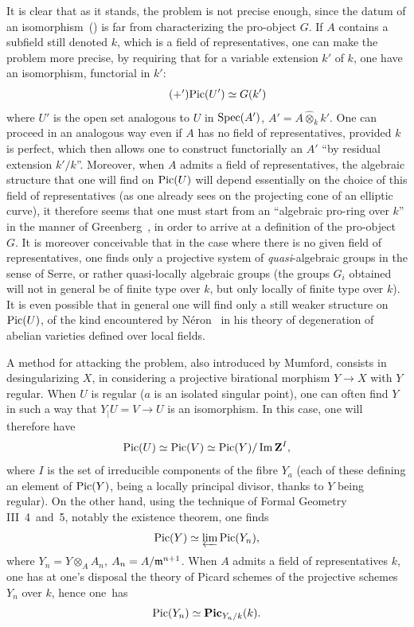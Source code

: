 It is clear that as it stands, the problem is not precise enough, since the datum of an isomorphism~() is far from characterizing the pro-object $G$. If $A$ contains a subfield still denoted $k$, which is a field of representatives, one can make the problem more precise, by requiring that for a variable extension $k'$ of $k$, one have an isomorphism, functorial in $k'$: \begin{equation*} \label{eq:XIII.5.+'} \tag{$+'$} {\operatorname{Pic}(U')\simeq G(k')} \end{equation*} where $U'$ is the open set analogous to $U$ in $\operatorname{Spec}(A')$, $A'=A\hat{\otimes}_k k'$. One can proceed in an analogous way even if $A$ has no field of representatives, provided $k$ is perfect, which then allows one to construct functorially an $A'$ ``by residual extension $k'/k$''. Moreover, when $A$ admits a field of representatives, the algebraic structure that one will find on $\operatorname{Pic}(U)$ will depend essentially on the choice of this field of representatives (as one already sees on the projecting cone of an elliptic curve), it therefore seems that one must start from an ``algebraic pro-ring over $k$'' in the manner of Greenberg~\cite{XIII.3}, in order to arrive at a definition of the pro-object $G$. It is moreover conceivable that in the case where there is no given field of representatives, one finds only a projective system of \emph{quasi}-algebraic groups in the sense of Serre, or rather quasi-locally algebraic groups (the groups $G_i$ obtained will not in general be of finite type over $k$, but only locally of finite type over $k$). It is even possible that in general one will find only a still weaker structure on $\operatorname{Pic}(U)$, of the kind encountered by N\'eron~\cite{XIII.6} in his theory of degeneration of abelian varieties defined over local fields.

A method for attacking the problem, also introduced by Mumford, consists in desingularizing $X$, \ie in considering a projective birational morphism $Y\to X$ with $Y$ regular. When $U$ is regular (\ie $a$ is an isolated singular point), one can often find $Y$ in such a way that $Y_|U=V\to U$ is an isomorphism. In this case, one will therefore have $$ \operatorname{Pic}(U)\simeq\operatorname{Pic}(V)\simeq\operatorname{Pic}(Y)/\operatorname{Im} \mathbf{Z}^I, $$ where $I$ is the set of irreducible components of the fibre $Y_{a}$ (each of these defining an element of $\operatorname{Pic}(Y)$, being a locally principal divisor, thanks to $Y$ being regular). On the other hand, using the technique of Formal Geometry \EGA III~4~and~5, notably the existence theorem, one finds $$ \operatorname{Pic}(Y)\simeq\varprojlim\operatorname{Pic}(Y_n), $$ where $Y_n=Y\otimes_A A_n$, $A_n=A/\mathfrak{m}^{n+1}$. When $A$ admits a field of representatives $k$, one has at one's disposal the theory of Picard schemes of the projective schemes $Y_n$ over $k$, hence one~has $$ \operatorname{Pic}(Y_n)\simeq \mathbf{Pic}_{Y_n/k}(k). $$

